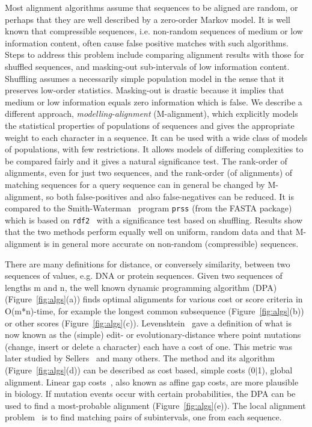 \documentclass[letterpaper,11pt,oneside]{article}
\begin{document}
Most alignment algorithms assume that sequences to be aligned are random,
or perhaps that they are well described by a zero-order Markov model.
It is well known that compressible sequences,
i.e. non-random sequences of medium or low information content,
often cause false positive matches with such algorithms.
Steps to address this problem include
comparing alignment results with those for shuffled sequences, and
masking-out sub-intervals of low information content.
Shuffling assumes a necessarily simple population model in the sense that it preserves low-order statistics.
Masking-out is drastic because it implies that
medium or low information equals zero information which is false.
We describe a different approach, {\em modelling-alignment} (M-alignment), which explicitly models
the statistical properties of populations of sequences and
gives the appropriate weight to each character in a sequence.
It can be used with a wide class of models of populations,
with few restrictions.
It allows models of differing complexities to be compared fairly and
it gives a natural significance test.
The rank-order of alignments, even for just two sequences, and
the rank-order (of alignments) of matching sequences for a query sequence
can in general
be changed by M-alignment, so both false-positives and also false-negatives can be reduced.
It is compared to the Smith-Waterman~\cite{smith81} program \verb!prss! (from the FASTA
package) which is based on \verb!rdf2!~\cite{pearson88}
with a significance test based on shuffling.
Results show that the two methods perform equally well on uniform, random data and
that M-alignment is in general more accurate on non-random (compressible) sequences.

There are many definitions for
distance, or conversely similarity, between two
sequences of values, e.g. DNA or protein sequences.
Given two sequences of lengths m and n,
the well known dynamic programming algorithm (DPA) (Figure~\ref{fig:algs}(a)) finds
optimal alignments for various cost or score criteria in O(m*n)-time,
for example the longest common subsequence (Figure~\ref{fig:algs}(b)) or
other scores (Figure~\ref{fig:algs}(c)).
Levenshtein~\cite{levenshtein66} gave a definition of what is now known as the
(simple) edit- or evolutionary-distance where point mutations
(change, insert or delete a character) each have a cost of one.
This metric was later studied by Sellers~\cite{sellers74} and many others.
The method and its algorithm (Figure~\ref{fig:algs}(d)) can be described as cost based, simple costs (0$|$1), global alignment.
Linear gap costs~\cite{gotoh82}, also known as affine gap costs, are more plausible in biology.
If mutation events occur with certain probabilities,
the DPA can be used to find a most-probable alignment (Figure~\ref{fig:algs}(e)).
The local alignment problem~\cite{sellers80} is to find
matching pairs of subintervals, one from each sequence.
\end{document}
